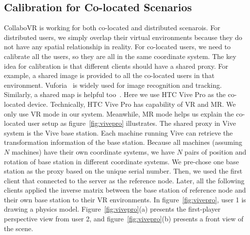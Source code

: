 \documentclass{sigchi}
\begin{document}
\subsection{Calibration for Co-located Scenarios}
CollaboVR is working for both co-located and distributed scenarois. For distributed users, we simply overlap their virtual environments because they do not have any spatial relationship in reality. For co-located users, we need to calibrate all the users, so they are all in the same coordinate system. The key idea for calibration is that different clients should have a shared proxy. For example, a shared image is provided to all the co-located users in that environment. Vuforia~\cite{Vuforia} is widely used for image recognition and tracking. Similarly, a shared map is helpful too~\cite{Hololens}. Here we use HTC Vive Pro as the co-located device. Technically, HTC Vive Pro has capability of VR and MR. We only use VR mode in our system. Meanwhile, MR mode helps us explain the co-located user setup as figure~\ref{fig:vivepro} illustrates. The shared proxy in Vive system is the Vive base station. Each machine running Vive can retrieve the transformation information of the base station. Because all machines (assuming $N$ machines) have their own coordinate systems, we have $N$ pairs of position and rotation of base station in different coordinate systems. We pre-chose one base station as the proxy based on the unique serial number. Then, we used the first client that connected to the server as the reference node. Later, all the following clients applied the inverse matrix between the base station of reference node and their own base station to their VR environments. In figure~\ref{fig:vivepro}, user 1 is drawing a physics model. Figure~\ref{fig:vivepro}(a) presents the first-player perspective view from user 2, and figure~\ref{fig:vivepro}(b) presents a front view of the scene.
\end{document}
